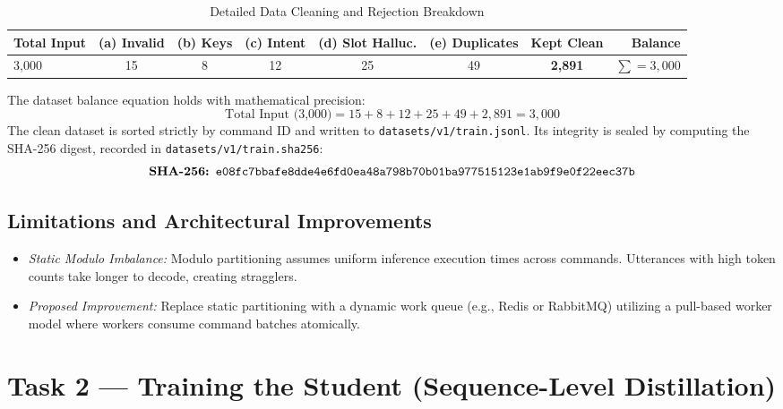 \documentclass[10pt,a4paper]{article}
\begin{document}
\begin{table}[h!]
\centering
\footnotesize
\caption{Detailed Data Cleaning and Rejection Breakdown}
\vspace{0.1cm}
\begin{tabular*}{\textwidth}{@{\extracolsep{\fill}}lccccccr@{}}
\toprule
\textbf{Total Input} & \textbf{(a) Invalid} & \textbf{(b) Keys} & \textbf{(c) Intent} & \textbf{(d) Slot Halluc.} & \textbf{(e) Duplicates} & \textbf{Kept Clean} & \textbf{Balance} \\
\midrule
3,000 & 15 & 8 & 12 & 25 & 49 & \textbf{2,891} & $\sum = 3,000$ \\
\bottomrule
\end{tabular*}
\end{table}

The dataset balance equation holds with mathematical precision:
$$\text{Total Input (3,000)} = 15 + 8 + 12 + 25 + 49 + 2,891 = 3,000$$
The clean dataset is sorted strictly by command ID and written to \texttt{datasets/v1/train.jsonl}. Its integrity is sealed by computing the SHA-256 digest, recorded in \texttt{datasets/v1/train.sha256}:
$$\text{\textbf{SHA-256: }} \texttt{e08fc7bbafe8dde4e6fd0ea48a798b70b01ba977515123e1ab9f9e0f22eec37b}$$

\subsection{Limitations and Architectural Improvements}
\begin{itemize}[noitemsep,topsep=2pt,leftmargin=*]
    \item \textit{Static Modulo Imbalance:} Modulo partitioning assumes uniform inference execution times across commands. Utterances with high token counts take longer to decode, creating stragglers.
    \item \textit{Proposed Improvement:} Replace static partitioning with a dynamic work queue (e.g., Redis or RabbitMQ) utilizing a pull-based worker model where workers consume command batches atomically.
\end{itemize}

\vspace{0.25cm}

\section{Task 2 --- Training the Student (Sequence-Level Distillation)}
\end{document}

